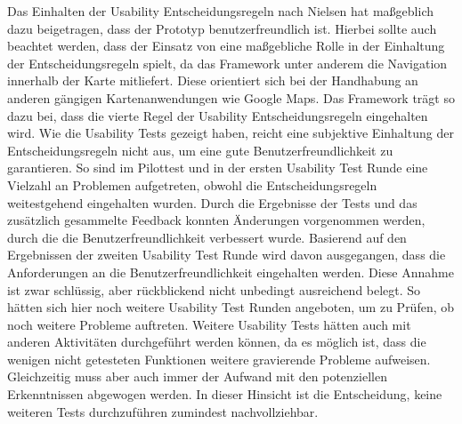 Das Einhalten der Usability Entscheidungsregeln nach Nielsen \cite{Nielsen.1994} hat maßgeblich dazu beigetragen, dass der Prototyp benutzerfreundlich ist. Hierbei sollte auch beachtet werden, dass der Einsatz von \deckgl{} eine maßgebliche Rolle in der Einhaltung der Entscheidungsregeln spielt, da das Framework unter anderem die Navigation innerhalb der Karte mitliefert. Diese orientiert sich bei der Handhabung an anderen gängigen Kartenanwendungen wie Google Maps. Das Framework trägt so dazu bei, dass die vierte Regel der Usability Entscheidungsregeln \cite[Regel 4]{Nielsen.1994} eingehalten wird. Wie die Usability Tests gezeigt haben, reicht eine subjektive Einhaltung der Entscheidungsregeln nicht aus, um eine gute Benutzerfreundlichkeit zu garantieren. So sind im Pilottest und in der ersten Usability Test Runde eine Vielzahl an Problemen aufgetreten, obwohl die Entscheidungsregeln weitestgehend eingehalten wurden. Durch die Ergebnisse der Tests und das zusätzlich gesammelte Feedback konnten Änderungen vorgenommen werden, durch die die Benutzerfreundlichkeit verbessert wurde. Basierend auf den Ergebnissen der zweiten Usability Test Runde wird davon ausgegangen, dass die Anforderungen an die Benutzerfreundlichkeit eingehalten werden. Diese Annahme ist zwar schlüssig, aber rückblickend nicht unbedingt ausreichend belegt. So hätten sich hier noch weitere Usability Test Runden angeboten, um zu Prüfen, ob noch weitere Probleme auftreten. Weitere Usability Tests hätten auch mit anderen Aktivitäten durchgeführt werden können, da es möglich ist, dass die wenigen nicht getesteten Funktionen weitere gravierende Probleme aufweisen. Gleichzeitig muss aber auch immer der Aufwand mit den potenziellen Erkenntnissen abgewogen werden. In dieser Hinsicht ist die Entscheidung, keine weiteren Tests durchzuführen zumindest nachvollziehbar.


